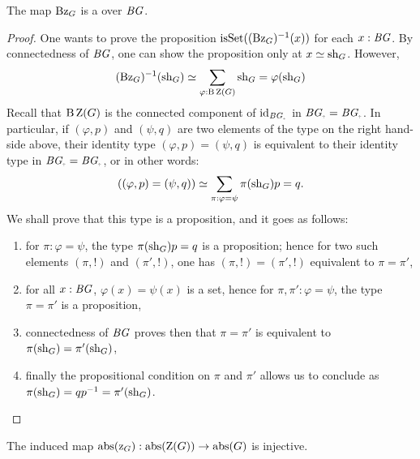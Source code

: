 \begin{lemma}
  \label{lemma:center-is-subgroup}%
  The map $\mathrm{B} \mathrm z_{{G}}$ is a \covering over $\mathit{B}\mathit{G}$.
\end{lemma}
\begin{proof}
  One wants to prove the proposition
  $\isset(\inv{(\B\grpcenterinc G)}(x))$ for each $x:\mathit{B}\mathit{G}$. By connectedness
  of $\mathit{B}\mathit{G}$, one can show the proposition only at $x\jdeq
  \sh_G$. However,
  \begin{displaymath}
    \inv{(\B\grpcenterinc G)}(\sh_G) \weq \sum_{\varphi:{\B\grpcenter(G)}}{\sh_G = \varphi(\sh_G)}
  \end{displaymath}
  Recall that $\B\grpcenter(G)$ is the connected component of
  $\id_{\BG_\div}$ in $\BG_\div = \BG_\div$. In particular, if $(\varphi,p)$
  and $(\psi,q)$ are two elements of the type on the right hand-side
  above, their identity type $(\varphi,p)=(\psi,q)$ is equivalent to
  their identity type in $\BG_\div = \BG_\div$, or in other words:
  \begin{displaymath}
    ((\varphi,p) = (\psi,q)) \simeq \sum_{\pi:\varphi=\psi}\pi(\mathrm{sh}_G) p = q.
  \end{displaymath}
  We shall prove that this type is a proposition, and it goes as
  follows:
  \begin{enumerate}
  \item for $\pi:\varphi=\psi$, the type $\pi(\mathrm{sh}_G) p = q$ is a
    proposition; hence for two such elements $(\pi,!)$ and $(\pi',!)$,
    one has $(\pi,!)=(\pi',!)$ equivalent to $\pi=\pi'$,
  \item for all $x:\mathit{B}\mathit{G}$, $\varphi(x)=\psi(x)$ is a set, hence for
    $\pi,\pi':\varphi=\psi$, the type $\pi=\pi'$ is a proposition,
  \item connectedness of $\mathit{B}\mathit{G}$ proves then that $\pi=\pi'$ is equivalent
    to $\pi(\mathrm{sh}_G)=\pi'(\mathrm{sh}_G)$,
  \item finally the propositional condition on $\pi$ and $\pi'$ allows
    us to conclude as $\pi(\mathrm{sh}_G)= qp^{-1} = \pi'(\mathrm{sh}_G)$.
  \end{enumerate} 
\end{proof}

\begin{corollary}
  \label{lemma:center-inc-inj-on-paths}%
  The induced map
  $\abstr {(\grpcenterinc G)}: \abstr(\grpcenter(G)) \to \abstr(G)$ is
  injective.
\end{corollary}

